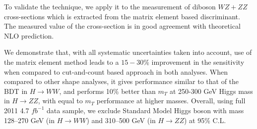 \documentclass{cmspaper}
\begin{document}
To validate the technique, we apply it to the measurement of diboson $WZ+ZZ$ cross-sections which is extracted from
the matrix element based discriminant. The measured value of the cross-section is in good agreement with theoretical NLO prediction.

We demonstrate that, with all systematic uncertainties taken into account, use of the matrix element method 
leads to a $15-30 \%$ improvement in the sensitivity when compared to cut-and-count based approach in both analyses. 
When compared to other shape analyses, it gives performance similar to that of the BDT in $H\rightarrow WW$, and performs 10\% better 
than $m_{T}$ at 250-300 GeV Higgs mass in $H\rightarrow ZZ$, with equal to $m_{T}$ performance at higher masses. 
Overall, using full 2011 4.7 $fb^{-1}$ data sample, we exclude Standard Model Higgs boson with 
mass 128--270 GeV (in $H\rightarrow WW$) and 310--500 GeV (in $H\rightarrow ZZ$) at 95\% C.L.

 
\end{document}
